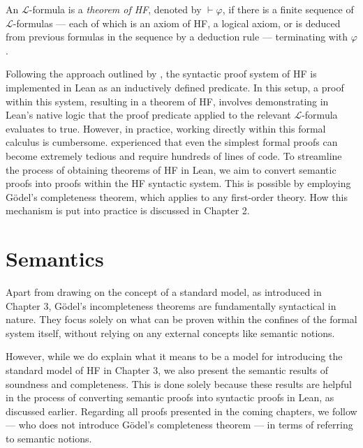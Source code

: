 \begin{definition}[Theorem of HF]
    \label{def:Prf}
    \leanok
    An $\mathcal{L}$-formula is a \textit{theorem of HF}, denoted by $\vdash \varphi$, 
    if there is a finite sequence of $\mathcal{L}$-formulas — each of which is an axiom of HF, 
    a logical axiom, or is deduced from previous formulas in the sequence by a deduction rule —
    terminating with $\varphi$.
\end{definition}

Following the approach outlined by \cite{paulson2014machine}, 
the syntactic proof system of HF is implemented in Lean as an inductively defined predicate. 
In this setup, a proof within this system, resulting in a theorem of HF, 
involves demonstrating in Lean’s native logic that 
the proof predicate applied to the relevant $\mathcal{L}$-formula evaluates to true.
However, in practice, working directly within this formal calculus is cumbersome. 
\cite{paulson2014machine} experienced that even the simplest formal proofs can become extremely 
tedious and require hundreds of lines of code.
To streamline the process of obtaining theorems of HF in Lean, 
we aim to convert semantic proofs into proofs within the HF syntactic system. 
This is possible by employing Gödel's completeness theorem, which applies to any first-order theory.
How this mechanism is put into practice is discussed in Chapter 2.

\section{Semantics}

Apart from drawing on the concept of a standard model, as introduced in Chapter 3, 
Gödel's incompleteness theorems are fundamentally syntactical in nature. 
They focus solely on what can be proven within the confines of the formal system itself, 
without relying on any external concepts like semantic notions.

However, while we do explain what it means to be a model for introducing the standard model of 
HF in Chapter 3, we also present the semantic results of soundness and completeness. 
This is done solely because these results are helpful in the process of converting semantic proofs 
into syntactic proofs in Lean, as discussed earlier.
Regarding all proofs presented in the coming chapters, we follow 
\cite{swierczkowski2003finite} — who does not introduce Gödel's completeness theorem — 
in terms of referring to semantic notions.

